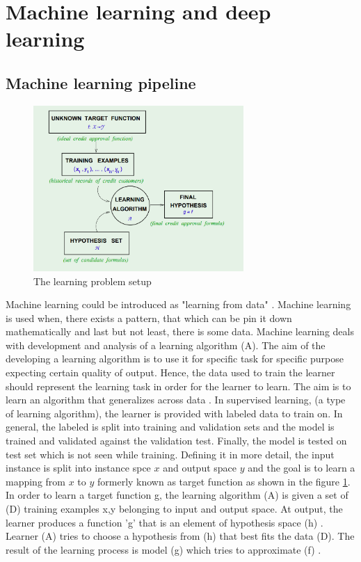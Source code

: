 \section{Machine learning and deep learning}
\subsection{Machine learning pipeline}
\begin{figure}[t]
            \includegraphics[width=8cm]{thesis/figures/MLpipeline.PNG}
            \centering
            \caption{The learning problem setup\cite{abu2012learning}}
            \label{fig:The learning problem setup}
        \end{figure}
Machine learning could be introduced as "learning from data" \cite{abu2012learning}. Machine learning is used when, there exists a pattern, that which can be pin it down mathematically and last but not least, there is some data\cite{abu2012learning}. Machine learning deals with development and analysis of a learning algorithm (A). The aim of the developing a learning algorithm is to use it for specific task for specific purpose expecting certain quality of output\cite{abu2012learning}.  Hence, the data used to train the learner should represent the learning task in order for the learner to learn.  The aim is to learn an algorithm that generalizes across data \cite{abu2012learning}. In supervised learning, (a type of learning algorithm), the learner is provided with labeled data to train on. In general, the labeled is split into training and validation sets and the model is trained and validated against the validation test. Finally, the model is tested on test set which is not seen while training\cite{abu2012learning}. Defining it in more detail, the input instance is split into instance spce $x$ and output space $y$ and the goal is to learn a mapping from $x$ to $y$ formerly known as target function as shown in the figure \ref{fig:The learning problem setup}. In order to learn a target function g, the learning algorithm (A) is given a set of (D) training examples {x,y} belonging to input and output space\cite{abu2012learning}. At output, the learner produces a function 'g' that is an element of hypothesis space (h) \cite{abu2012learning}. Learner (A) tries to choose a hypothesis from (h) that best fits the data (D). The result of the learning process is model (g) which tries to approximate (f)  \cite{abu2012learning}.
